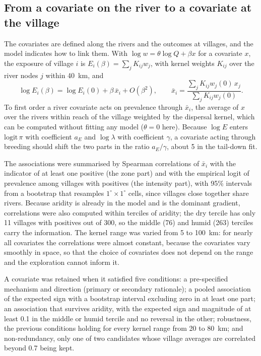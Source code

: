 \documentclass[11pt,a4paper]{article}
\begin{document}
\subsection*{From a covariate on the river to a covariate at the village}

The covariates are defined along the rivers and the outcomes at villages, and the model indicates how to link them. With $\log w = \theta \log Q + \beta x$ for a covariate $x$, the exposure of village $i$ is $E_i(\beta) = \sum_j K_{ij} w_j$, with kernel weights $K_{ij}$ over the river nodes $j$ within 40~km, and
\[
\log E_i(\beta) = \log E_i(0) + \beta\, \bar{x}_i + O(\beta^2), \qquad
\bar{x}_i = \frac{\sum_j K_{ij} w_j(0)\, x_j}{\sum_j K_{ij} w_j(0)} .
\]
To first order a river covariate acts on prevalence through $\bar x_i$, the average of $x$ over the rivers within reach of the village weighted by the dispersal kernel, which can be computed without fitting any model ($\theta = 0$ here). Because $\log E$ enters $\mathrm{logit}\,\pi$ with coefficient $a_E$ and $\log\lambda$ with coefficient $\gamma$, a covariate acting through breeding should shift the two parts in the ratio $a_E/\gamma$, about 5 in the tail-down fit.

The associations were summarised by Spearman correlations of $\bar x_i$ with the indicator of at least one positive (the zone part) and with the empirical logit of prevalence among villages with positives (the intensity part), with 95\% intervals from a bootstrap that resamples $1^\circ \times 1^\circ$ cells, since villages close together share rivers. Because aridity is already in the model and is the dominant gradient, correlations were also computed within terciles of aridity; the dry tercile has only 11 villages with positives out of 300, so the middle (76) and humid (263) terciles carry the information. The kernel range was varied from 5 to 100~km: for nearly all covariates the correlations were almost constant, because the covariates vary smoothly in space, so that the choice of covariates does not depend on the range and the exploration cannot inform it.

A covariate was retained when it satisfied five conditions: a pre-specified mechanism and direction (primary or secondary rationale); a pooled association of the expected sign with a bootstrap interval excluding zero in at least one part; an association that survives aridity, with the expected sign and magnitude of at least 0.1 in the middle or humid tercile and no reversal in the other; robustness, the previous conditions holding for every kernel range from 20 to 80~km; and non-redundancy, only one of two candidates whose village averages are correlated beyond 0.7 being kept.
\end{document}
